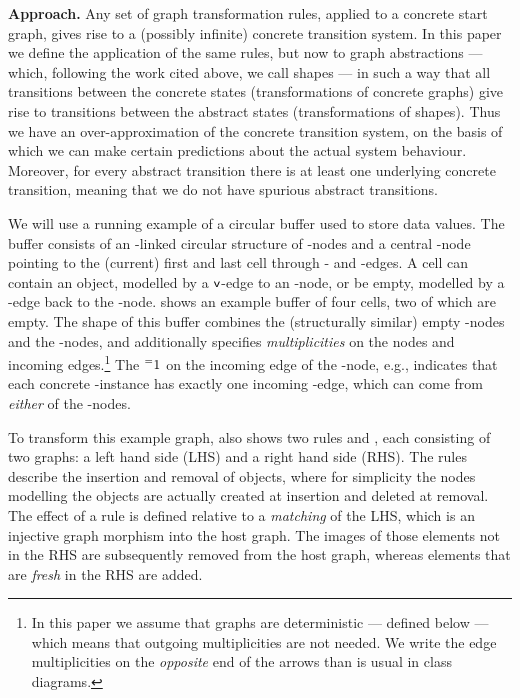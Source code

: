 \medskip\noindent \textbf{Approach.}
%
Any set of graph transformation rules, applied to a concrete start graph, gives
rise to a (possibly infinite) concrete transition system. In this paper we
define the application of the same rules, but now to graph abstractions ---
which, following the work cited above, we call shapes --- in such a way that
all transitions between the concrete states (transformations of concrete
graphs) give rise to transitions between the abstract states (transformations
of shapes). Thus we have an over-approximation of the concrete transition
system, on the basis of which we can make certain predictions about the actual
system behaviour.  Moreover, for every abstract transition there is at least
one underlying concrete transition, meaning that we do not have spurious
abstract transitions.  

We will use a running example of a circular buffer used
to store data values.  The buffer consists of an \Ln-linked circular structure
of \LC-nodes and a central \LB-node pointing to the (current) first and last
cell through \Lf- and \Ll-edges. A cell can contain an object, modelled by a
${\mathsf{v}}$-edge to an \LO-node, or be empty, modelled by a \Le-edge back to the
\LB-node.   shows an example buffer of four cells, two of
which are empty. The shape of this buffer combines the (structurally similar)
empty \LC-nodes and the \LO-nodes, and additionally specifies
\emph{multiplicities} on the nodes and incoming edges.\footnote{In this paper
  we assume that graphs are deterministic --- defined below --- which means
  that outgoing multiplicities are not needed.  We write the edge
  multiplicities on the \emph{opposite} end of the arrows than is usual in
  class diagrams.} The ${{}^{=}{1}}$ on the incoming edge of the \LO-node, e.g.,
indicates that each concrete \LO-instance has exactly one incoming \Lv-edge,
which can come from \emph{either} of the \LC-nodes.

%
%
To transform this example graph,  also shows two rules
\Rput{} and \Rget, each consisting of two graphs: a left hand side (LHS) and a
right hand side (RHS). The rules describe the insertion and removal of objects,
where for simplicity the nodes modelling the objects are actually created at
insertion and deleted at removal. The effect of a rule is defined relative to a
\emph{matching} of the LHS, which is an injective graph morphism into the host
graph. The images of those elements not in the RHS are subsequently
removed from the host graph, whereas elements that are \emph{fresh} in the RHS
are added.

